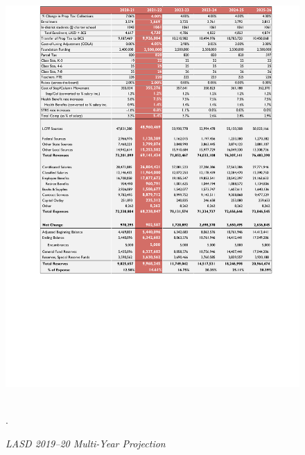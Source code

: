 \begin{figure}[!t]
  \centering
  \caption[LASD 2019–20 Multi-Year Projection]{\textit{LASD 2019–20 Multi-Year Projection}}\label{fig:multi-year-proj}
  \includegraphics[width=\textwidth]{LASD_Multi_Year_Projection}\
  \footnotesize\raggedright\textcite[137]{Kenyon2021a}.
\end{figure}\bigskip%


